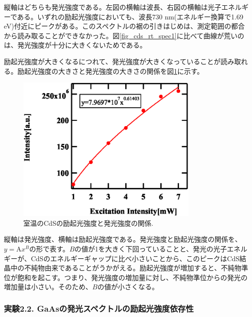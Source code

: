 \documentclass[11pt,a4j]{jsarticle}
\begin{document}
縦軸はどちらも発光強度である。左図の横軸は波長、右図の横軸は光子エネルギーである。いずれの励起光強度においても、波長730 nm(エネルギー換算で1.69 eV)付近にピークがある。このスペクトルの裾の引きはじめは、測定範囲の都合から読み取ることができなかった。図\ref{fig_cds_rt_spec1}に比べて曲線が荒いのは、発光強度が十分に大きくないためである。


励起光強度が大きくなるにつれて、発光強度が大きくなっていることが読み取れる。励起光強度の大きさと発光強度の大きさの関係を図\ref{fig_cds_imp_int1}に示す。

\newpage

\begin{figure}[ht]
 \centering
 \includegraphics[clip,width=9cm]{start2_CdS_imp_Int.eps}
 \caption{室温のCdSの励起光強度と発光強度の関係.}
 \label{fig_cds_imp_int1}
\end{figure}

縦軸は発光強度、横軸は励起光強度である。発光強度と励起光強度の関係を、$y=\mathrm{A}x^{B}$の形で表す。$B$の値が1を大きく下回っていることと、発光の光子エネルギーが、CdSのエネルギーギャップに比べ小さいことから、このピークはCdS結晶中の不純物由来であることがうかがえる。励起光強度が増加すると、不純物準位が飽和を起こす。つまり、発光強度の増加量に対し、不純物準位からの発光の増加量は小さい。そのため、$B$の値が小さくなる。

\newpage
\subsubsection{実験2.2. GaAsの発光スペクトルの励起光強度依存性}
\end{document}
